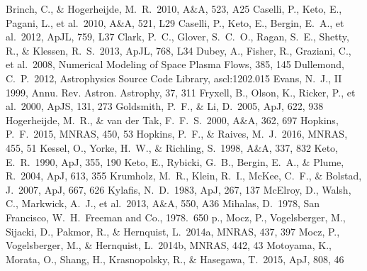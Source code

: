 \documentclass{mn2e}
\newcommand{\apj}{ApJ}
\newcommand{\araa}{Annu. Rev. Astron. Astrophy}
\newcommand{\apjl}{ApJL}
\newcommand{\mnras}{MNRAS}
\newcommand{\apjs}{ApJS}
\newcommand{\aap}{A\&A}
\begin{document}
\begin{thebibliography}{99}
 Brinch, C., \& Hogerheijde, M.~R.\ 2010, \aap, 523, A25
 Caselli, P., Keto, E., Pagani, L., et al.\ 2010, \aap, 521, L29  
 Caselli, P., Keto, E., Bergin, E.~A., et al.\ 2012, \apjl, 759, L37 
 Clark, P.~C., Glover, S.~C.~O., Ragan, S.~E., Shetty, R., \& Klessen, R.~S.\ 2013, \apjl, 768, L34
 Dubey, A., Fisher, R., Graziani, C., et al.\ 2008, Numerical Modeling of Space Plasma Flows, 385, 145 
 Dullemond, C.~P.\ 2012, Astrophysics Source Code Library, ascl:1202.015 
 Evans, N.~J., II 1999, \araa, 37, 311 
 Fryxell, B., Olson, K., Ricker, P., et al.\ 2000, \apjs, 131, 273
 Goldsmith, P.~F., \& Li, D.\ 2005, \apj, 622, 938 
 Hogerheijde, M.~R., \& van der Tak, F.~F.~S.\ 2000, \aap, 362, 697 
 Hopkins, P.~F.\ 2015, \mnras, 450, 53 
 Hopkins, P.~F., \& Raives, M.~J.\ 2016, \mnras, 455, 51
 Kessel, O., Yorke, H.~W., \& Richling, S.\ 1998, \aap, 337, 832 
 Keto, E.~R.\ 1990, \apj, 355, 190 
 Keto, E., Rybicki, G.~B., Bergin, E.~A., \& Plume, R.\ 2004, \apj, 613, 355 
 Krumholz, M.~R., Klein, R.~I., McKee, C.~F., \& Bolstad, J.\ 2007, \apj, 667, 626 
 Kylafis, N.~D.\ 1983, \apj, 267, 137 
 McElroy, D., Walsh, C., Markwick, A.~J., et al.\ 2013, \aap, 550, A36 
 Mihalas, D.\ 1978, San Francisco, W.~H.~Freeman and Co., 1978.~650 p.,   
 Mocz, P., Vogelsberger, M., Sijacki, D., Pakmor, R., \& Hernquist, L.\ 2014a, \mnras, 437, 397
 Mocz, P., Vogelsberger, M., \& Hernquist, L.\ 2014b, \mnras, 442, 43 
 Motoyama, K., Morata, O., Shang, H., Krasnopolsky, R., \& Hasegawa, T.\ 2015, \apj, 808, 46

\end{thebibliography}
\end{document}
